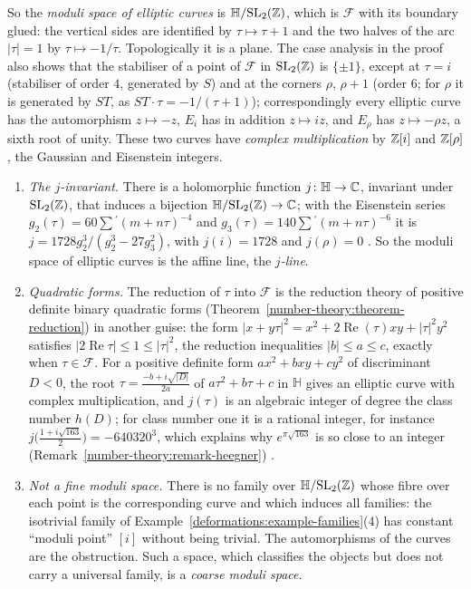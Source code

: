 So the \emph{moduli space of elliptic curves} is $\mathbb{H}/\mathrm{SL}_2(\mathbb{Z})$, which is $\mathcal{F}$ with its boundary glued: the vertical sides are identified by $\tau \mapsto \tau + 1$ and the two halves of the
arc $|\tau| = 1$ by $\tau \mapsto -1/\tau$. Topologically it is a plane. The case analysis in the proof also shows that the stabiliser of a point of $\mathcal{F}$ in $\mathrm{SL}_2(\mathbb{Z})$ is $\{\pm1\}$, except at
$\tau = i$ (stabiliser of order $4$, generated by $S$) and at the corners $\rho$, $\rho + 1$ (order $6$; for $\rho$ it is generated by $ST$, as $ST\cdot\tau = -1/(\tau + 1)$); correspondingly every elliptic curve has the automorphism $z \mapsto -z$, $E_i$ has in addition $z \mapsto iz$, and $E_\rho$ has $z \mapsto -\rho z$, a sixth root of
unity. These two curves have \emph{complex multiplication} by $\mathbb{Z}[i]$ and $\mathbb{Z}[\rho]$, the Gaussian and Eisenstein integers.

\begin{remark}\label{deformations:remark-elliptic-moduli}
\begin{enumerate}
\item \emph{The $j$-invariant.} There is a holomorphic function $j \colon \mathbb{H} \to \mathbb{C}$, invariant under $\mathrm{SL}_2(\mathbb{Z})$, that induces a bijection $\mathbb{H}/\mathrm{SL}_2(\mathbb{Z}) \to \mathbb{C}$; with the Eisenstein series
$g_2(\tau) = 60\sum{}^{\prime}(m + n\tau)^{-4}$ and $g_3(\tau) = 140\sum{}^{\prime}(m + n\tau)^{-6}$ it is $j = 1728g_2^3/(g_2^3 - 27g_3^2)$, with $j(i) = 1728$ and $j(\rho) = 0$ \cite[Chapter VII]{serre-arithmetic}. So the moduli
space of elliptic curves is the affine line, the \emph{$j$-line}.
\item \emph{Quadratic forms.} The reduction of $\tau$ into $\mathcal{F}$ is the reduction theory of positive definite binary quadratic forms (Theorem~\ref{number-theory:theorem-reduction}) in another guise:
the form $|x + y\tau|^2 = x^2 + 2\operatorname{Re}(\tau)xy + |\tau|^2y^2$ satisfies $|2\operatorname{Re}\tau| \leq 1 \leq |\tau|^2$, the reduction inequalities $|b| \leq a \leq c$, exactly when $\tau \in \mathcal{F}$. For a
positive definite form $ax^2 + bxy + cy^2$ of discriminant $D < 0$, the root $\tau = \frac{-b + i\sqrt{|D|}}{2a}$ of $a\tau^2 + b\tau + c$ in $\mathbb{H}$ gives an elliptic curve with complex multiplication, and
$j(\tau)$ is an algebraic integer of degree the class number $h(D)$; for class number one it is a rational integer, for instance $j\bigl(\frac{1 + i\sqrt{163}}{2}\bigr) = -640320^3$, which explains why
$e^{\pi\sqrt{163}}$ is so close to an integer (Remark~\ref{number-theory:remark-heegner}) \cite{cox-primes}.
\item \emph{Not a fine moduli space.} There is no family over $\mathbb{H}/\mathrm{SL}_2(\mathbb{Z})$ whose fibre over each point is the corresponding curve and which induces all families: the isotrivial family of
Example~\ref{deformations:example-families}(4) has constant ``moduli point'' $[i]$ without being trivial. The automorphisms of the curves are the obstruction. Such a space, which classifies the objects but
does not carry a universal family, is a \emph{coarse moduli space}.
\end{enumerate}
\end{remark}

